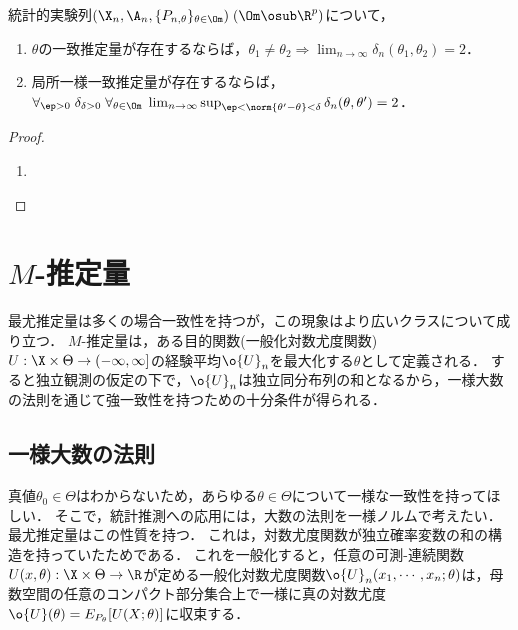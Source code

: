 \documentclass[uplatex,dvipdfmx]{jsreport}
\begin{document}
\begin{theorem}
    統計的実験列$(\X_n,\A_n,\{P_{n,\theta}\}_{\theta\in\Om})\;(\Om\osub\R^p)$について，
    \begin{enumerate}
        \item $\theta$の一致推定量が存在するならば，$\theta_1\ne\theta_2\Rightarrow\lim_{n\to\infty}\delta_n(\theta_1,\theta_2)=2$．
        \item 局所一様一致推定量が存在するならば，$\forall_{\ep>0}\;\delta_{\delta>0}\;\forall_{\theta\in\Om}\;\lim_{n\to\infty}\sup_{\ep<\norm{\theta'-\theta}<\delta}\delta_n(\theta,\theta')=2$．
    \end{enumerate}
\end{theorem}
\begin{proof}\mbox{}
    \begin{enumerate}
        \item 
    \end{enumerate}
\end{proof}

\section{$M$-推定量}

\begin{tcolorbox}[colframe=ForestGreen, colback=ForestGreen!10!white,breakable,colbacktitle=ForestGreen!40!white,coltitle=black,fonttitle=\bfseries\sffamily,
title=]
    最尤推定量は多くの場合一致性を持つが，この現象はより広いクラスについて成り立つ．
    $M$-推定量は，ある目的関数(一般化対数尤度関数)$U:\X\times\Theta\to(-\infty,\infty]$の経験平均$\o{U}_n$を最大化する$\theta$として定義される．
    すると独立観測の仮定の下で，$\o{U}_n$は独立同分布列の和となるから，一様大数の法則を通じて強一致性を持つための十分条件が得られる．
\end{tcolorbox}

\subsection{一様大数の法則}

\begin{tcolorbox}[colframe=ForestGreen, colback=ForestGreen!10!white,breakable,colbacktitle=ForestGreen!40!white,coltitle=black,fonttitle=\bfseries\sffamily,
title=]
    真値$\theta_0\in\Theta$はわからないため，あらゆる$\theta\in\Theta$について一様な一致性を持ってほしい．
    そこで，統計推測への応用には，大数の法則を一様ノルムで考えたい．
    最尤推定量はこの性質を持つ．
    これは，対数尤度関数が独立確率変数の和の構造を持っていたためである．
    これを一般化すると，任意の可測-連続関数$U(x,\theta):\X\times\Theta\to\R$が定める一般化対数尤度関数$\o{U}_n(x_1,\cdots,x_n;\theta)$は，母数空間の任意のコンパクト部分集合上で一様に真の対数尤度$\o{U}(\theta)=E_{P_\theta}[U(X;\theta)]$に収束する．
\end{tcolorbox}
\end{document}
